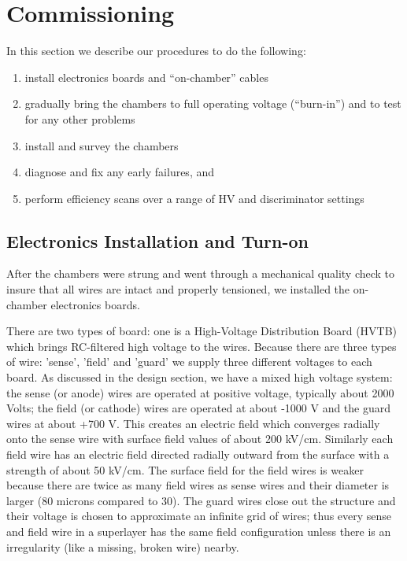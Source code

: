 \section{Commissioning}

In this section we describe our procedures to do the following:

\begin{enumerate}
\item install electronics boards and ``on-chamber'' cables
\item gradually bring the chambers to full operating voltage (``burn-in'') 
and to test for any other problems
\item install and survey the chambers
\item diagnose and fix any early failures, and
\item perform efficiency scans over a range of HV and discriminator settings
\end{enumerate}

\subsection{Electronics Installation and Turn-on}
After the chambers were strung and went through a mechanical quality
check to insure that all wires are intact and properly tensioned, we
installed the on-chamber electronics boards.

There are two types of board: one is a High-Voltage Distribution Board (HVTB)
which brings RC-filtered high voltage to the wires.  Because there are three
types of wire: 'sense', 'field' and 'guard' we supply three different voltages
to each board.  As discussed in the design section, we have a mixed high
voltage system: the sense (or anode) wires are operated at positive voltage,
typically about 2000 Volts; the field (or cathode) wires are operated at
about -1000 V and the guard wires at about +700 V.  This creates an
electric field which converges radially onto the sense wire with surface
field values of about 200 kV/cm.  Similarly each field wire has an
electric field directed radially outward from the surface with a strength
of about 50 kV/cm.  The surface field for the field wires is weaker 
because there are twice as many field wires as sense wires and their
diameter is larger (80 microns compared to 30).  The guard wires
close out the structure and their voltage is chosen to approximate an
infinite grid of wires; thus every sense and field wire in a superlayer
has the same field configuration unless there is an irregularity (like
a missing, broken wire) nearby.

